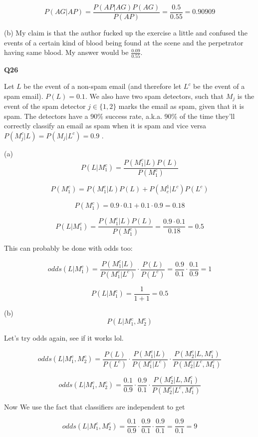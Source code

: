 \documentclass{article}
\begin{document}
				$$P(AG\vert AP) = \frac{P(AP\vert AG)P(AG)}{P(AP)} = \frac{0.5}{0.55} = 0.90909$$
				
				(b) My claim is that the author fucked up the exercise a little and confused the events of a certain kind of blood being found at the scene and the perpetrator having same blood. My answer would be $\frac{0.09}{0.55}$.
				
			\hfill
			
			\textbf{Q26}
				
				Let $L$ be the event of a non-spam email (and therefore let $L^c$ be the event of a spam email). $P(L) = 0.1$. We also have two spam detectors, such that $M_j$ is the event of the spam detector $j \in \{1, 2\}$ marks the email as spam, given that it is spam. The detectors have a 90\% success rate, a.k.a. 90\% of the time they'll correctly classify an email as spam when it is spam and vice versa $P(M_j^c\vert L) = P(M_j\vert L^c) = 0.9$ .
				
				(a) $$P(L\vert M_1^c) = \frac{P(M_1^c\vert L)P(L)}{P(M_1^c)}$$
				
				$$P(M_1^c) = P(M_1^c \vert L)P(L) + P(M^1_c\vert L^c)P(L^c)$$
				
				$$P(M_1^c) = 0.9\cdot 0.1 + 0.1\cdot 0.9 = 0.18$$
				
				$$P(L\vert M_1^c) = \frac{P(M_1^c\vert L)P(L)}{P(M_1^c)} = \frac{0.9\cdot 0.1}{0.18} = 0.5$$
		
				This can probably be done with odds too:
				
				$$odds(L\vert M^c_1) = \frac{P(M^c_1\vert L)}{P(M^c_1\vert L^c)}\cdot\frac{P(L)}{P(L^c)} = \frac{0.9}{0.1}\cdot\frac{0.1}{0.9} = 1$$
				
				$$P(L\vert M^c_1) = \frac{1}{1+1} = 0.5$$
				
				(b) $$P(L\vert M_1^c, M_2^c)$$
				
				Let's try odds again, see if it works lol.
				
				$$odds(L\vert M_1^c, M_2^c) = \frac{P(L)}{P(L^c)}\cdot\frac{P(M^c_1\vert L)}{P(M^c_1\vert L^c)}\cdot \frac{P(M^c_2\vert L, M^c_1)}{P(M^c_2\vert L^c, M^c_1)}$$
		
				$$odds(L\vert M_1^c, M_2^c) = \frac{0.1}{0.9}\cdot\frac{0.9}{0.1}\cdot \frac{P(M^c_2\vert L, M^c_1)}{P(M^c_2\vert L^c, M^c_1)}$$
				
				Now We use the fact that classifiers are independent to get 
				
				$$odds(L\vert M_1^c, M_2^c) = \frac{0.1}{0.9}\cdot\frac{0.9}{0.1}\cdot \frac{0.9}{0.1} = \frac{0.9}{0.1} = 9$$
				
\end{document}
